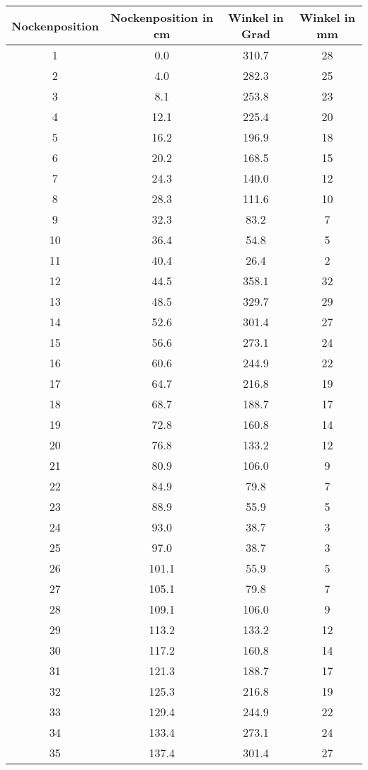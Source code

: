\documentclass[10pt, a4paper]{article}
\begin{document}
\begin{center}
	\begin{tabular}{c|c|c|c}
		Nockenposition & Nockenposition in cm & Winkel in Grad & Winkel in mm \\
		\hline
		1 & 0.0 & 310.7 & 28 \\
		2 & 4.0 & 282.3 & 25 \\
		3 & 8.1 & 253.8 & 23 \\
		4 & 12.1 & 225.4 & 20 \\
		5 & 16.2 & 196.9 & 18 \\
		6 & 20.2 & 168.5 & 15 \\
		7 & 24.3 & 140.0 & 12 \\
		8 & 28.3 & 111.6 & 10 \\
		9 & 32.3 & 83.2 & 7 \\
		10 & 36.4 & 54.8 & 5 \\
		11 & 40.4 & 26.4 & 2 \\
		12 & 44.5 & 358.1 & 32 \\
		13 & 48.5 & 329.7 & 29 \\
		14 & 52.6 & 301.4 & 27 \\
		15 & 56.6 & 273.1 & 24 \\
		16 & 60.6 & 244.9 & 22 \\
		17 & 64.7 & 216.8 & 19 \\
		18 & 68.7 & 188.7 & 17 \\
		19 & 72.8 & 160.8 & 14 \\
		20 & 76.8 & 133.2 & 12 \\
		21 & 80.9 & 106.0 & 9 \\
		22 & 84.9 & 79.8 & 7 \\
		23 & 88.9 & 55.9 & 5 \\
		24 & 93.0 & 38.7 & 3 \\
		25 & 97.0 & 38.7 & 3 \\
		26 & 101.1 & 55.9 & 5 \\
		27 & 105.1 & 79.8 & 7 \\
		28 & 109.1 & 106.0 & 9 \\
		29 & 113.2 & 133.2 & 12 \\
		30 & 117.2 & 160.8 & 14 \\
		31 & 121.3 & 188.7 & 17 \\
		32 & 125.3 & 216.8 & 19 \\
		33 & 129.4 & 244.9 & 22 \\
		34 & 133.4 & 273.1 & 24 \\
		35 & 137.4 & 301.4 & 27 \\

\end{tabular}
\end{center}
\end{document}
